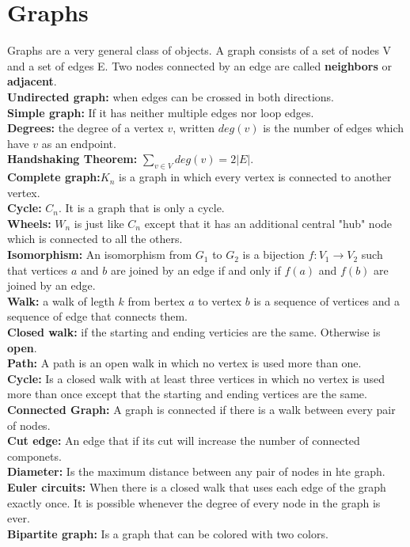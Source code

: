 \documentclass[a4paper]{article}
\begin{document}
\section{Graphs}
Graphs are a very general class of objects. A graph consists of a set of nodes V and a set of edges E. Two nodes connected by an edge are called {\bf neighbors} or {\bf adjacent}.\\
{\bf Undirected graph:} when edges can be crossed in both directions.\\
{\bf Simple graph:} If it has neither multiple edges nor loop edges.\\
{\bf Degrees:} the degree of a vertex $v$, written $deg(v)$ is the number of edges which have $v$ as an endpoint.\\
{\bf Handshaking Theorem:} $\sum_{v \in V} deg(v)= 2|E|$.\\
{\bf Complete graph:}$ K_n$ is a graph in which every vertex is connected to another vertex.\\
{\bf Cycle:} $C_n$. It is a graph that is only a cycle.\\
{\bf Wheels:} $W_n$ is just like $C_n$ except that it has an additional central "hub" node which is connected to all the others.\\
{\bf Isomorphism:} An isomorphism from $G_1$ to $G_2$ is a bijection $f: V_1 \rightarrow V_2$ such that vertices $a$ and $b$ are joined by an edge if and only if $f(a)$ and $f(b)$ are joined by an edge.\\
{\bf Walk:} a walk of legth $k$ from bertex $a$ to vertex $b$ is a sequence of vertices and a sequence of edge that connects them.\\
 {\bf Closed walk:} if the starting and ending verticies are the same. Otherwise is {\bf open}.\\
{\bf Path:} A path is an open walk in which no vertex is used more than one.\\
{\bf Cycle:} Is a closed walk with at least three vertices in which no vertex is used more than once except that the starting and ending vertices are the same.
{\bf Connected Graph:} A graph is connected if there is a walk between every pair of nodes.\\
{\bf Cut edge:} An edge that if its cut will increase the number of connected componets.\\
{\bf Diameter:} Is the maximum distance between any pair of nodes in hte graph.\\
{\bf Euler circuits:} When there is a closed walk that uses each edge of the graph exactly once. It is possible whenever the degree of every node in the graph is ever.\\
{\bf Bipartite graph:} Is a graph that can be colored with two colors.
\end{document}
